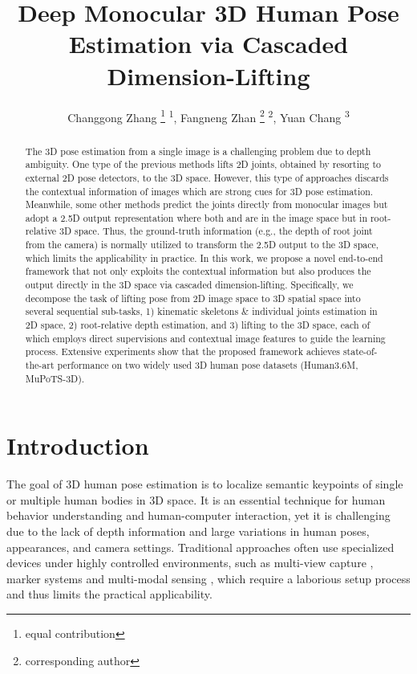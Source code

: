 \documentclass[letterpaper]{article} \usepackage{aaai21}  \usepackage{times}  \usepackage{helvet} \usepackage{courier}  \usepackage[hyphens]{url}  \usepackage{graphicx} \urlstyle{rm} \def\UrlFont{\rm}  \usepackage{natbib}  \usepackage{caption} \frenchspacing  \setlength{\pdfpagewidth}{8.5in}  \setlength{\pdfpageheight}{11in}
\title{Deep Monocular 3D Human Pose Estimation via Cascaded Dimension-Lifting}
\author {
Changgong Zhang  \thanks{equal contribution} \textsuperscript{\rm 1},
Fangneng Zhan \footnotemark[1] \thanks{corresponding author} \textsuperscript{\rm 2},
Yuan Chang  \textsuperscript{\rm 3} \\
}
\begin{document}
\maketitle

\begin{abstract}

The 3D pose estimation from a single image is a challenging problem due to depth ambiguity. One type of the previous methods lifts 2D joints, obtained by resorting to external 2D pose detectors, to the 3D space. However, this type of approaches discards the contextual information of images which are strong cues for 3D pose estimation. Meanwhile, some other methods predict the joints directly from monocular images but adopt a 2.5D output representation  where both  and  are in the image space but  in root-relative 3D space. Thus, the ground-truth information (e.g., the depth of root joint from the camera) is normally utilized to transform the 2.5D output to the 3D space, which limits the applicability in practice. In this work, we propose a novel end-to-end framework that not only exploits the contextual information but also produces the output directly in the 3D space via cascaded dimension-lifting. Specifically, we decompose the task of lifting pose from 2D image space to 3D spatial space into several sequential sub-tasks, 1) kinematic skeletons \& individual joints estimation in 2D space, 2) root-relative depth estimation, and 3) lifting to the 3D space, each of which employs direct supervisions and contextual image features to guide the learning process. Extensive experiments show that the proposed framework achieves state-of-the-art performance on two widely used 3D human pose datasets (Human3.6M, MuPoTS-3D).
\end{abstract}

\section{Introduction}
The goal of 3D human pose estimation is to localize semantic keypoints of single or multiple human bodies in 3D space. It is an essential technique for human behavior understanding and human-computer interaction, yet it is challenging due to the lack of depth information and large variations in human poses, appearances, and camera settings. Traditional approaches often use specialized devices under highly controlled environments, such as multi-view capture \cite{amin2013multi}, marker systems \cite{mandery2015kit} and multi-modal sensing \cite{palmero2016multi}, which require a laborious setup process and thus limits the practical applicability.
\end{document}

